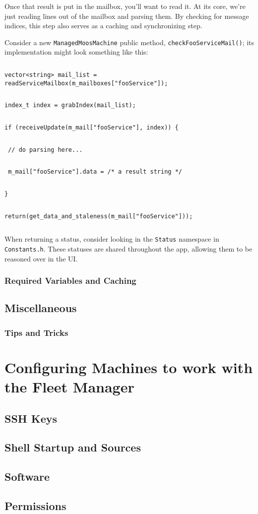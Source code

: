 \documentclass[11pt]{article}
\newcommand{\cmdline}[1]{\vspace{.2em} $\:$\\ \begin{minipage}{\dimexpr\textwidth-2cm}
\texttt{#1}
\end{minipage} $\:$\\ \vspace{-.2em} }
\begin{document}
Once that result is put in the mailbox, you'll want to read it. At its core, we're just reading lines out of the mailbox and parsing them. By checking for message indices, this step also serves as a caching and synchronizing step.

Consider a new \texttt{ManagedMoosMachine} public method, \texttt{checkFooServiceMail()}; its implementation might look something like this:

\cmdline{vector<string> mail\_list = readServiceMailbox(m\_mailboxes["fooService"]);}
\cmdline{index\_t index = grabIndex(mail\_list);}
\cmdline{if (receiveUpdate(m\_mail["fooService"], index)) \{}
\cmdline{	// do parsing here...}
\cmdline{	m\_mail["fooService"].data = /* a result string */}
\cmdline{\}}
\cmdline{return(get\_data\_and\_staleness(m\_mail["fooService"]));}

When returning a status, consider looking in the \texttt{Status} namespace in \texttt{Constants.h}. These statuses are shared throughout the app, allowing them to be reasoned over in the UI. 

\subsubsection{Required Variables and Caching}

\subsection{Miscellaneous}
\subsubsection{Tips and Tricks}
\section{Configuring Machines to work with the Fleet Manager}
\subsection{SSH Keys}
\subsection{Shell Startup and Sources}
\subsection{Software}
\subsection{Permissions}
\end{document}
